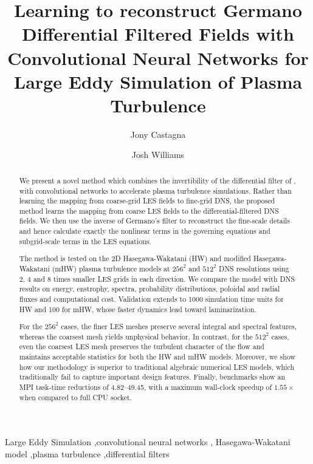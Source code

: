 \documentclass[authoryear,preprint,review,12pt]{elsarticle}
\begin{document}
\begin{frontmatter}

\title{Learning to reconstruct Germano Differential Filtered Fields with
Convolutional Neural Networks for Large Eddy Simulation of Plasma Turbulence
}

\author{Jony Castagna}
\author{Josh Williams}


\begin{abstract}
We present a novel method which combines the invertibility of the differential filter of \citet{germano_differential_1986}, with convolutional networks to accelerate plasma turbulence simulations.
Rather than learning the mapping from coarse-grid LES fields to fine-grid DNS, the proposed method learns the mapping from coarse LES fields to the differential-filtered DNS fields. 
We then use the inverse of Germano's filter to reconstruct the fine-scale details and hence calculate exactly the nonlinear terms in the governing equations and subgrid-scale terms in the LES equations.

The method is tested on the 2D Hasegawa-Wakatani (HW) and modified Hasegawa-Wakatani (mHW) plasma turbulence models at $256^2$ and $512^2$ DNS resolutions using 2, 4 and 8 times smaller LES grids in each direction. We compare the model with DNS results on energy, enstrophy, spectra, probability distributions, poloidal and radial fluxes and computational cost. Validation extends to 1000 simulation time units for HW and 100 for mHW, whose faster dynamics lead toward laminarization.

For the $256^2$ cases, the finer LES meshes preserve several integral and spectral features, whereas the coarsest mesh yields unphysical behavior. In contrast, for the $512^2$ cases, even the coarsest LES mesh preserves the turbulent character of the flow and maintains acceptable statistics for both the HW and mHW models. Moreover, we show how our methodology is superior to traditional algebraic numerical LES models, which traditionally fail to capture important design features.
Finally, benchmarks show an MPI task-time reductions of 4.82--49.45, with a maximum wall-clock speedup of $1.55\times$ when compared to full CPU socket.
\end{abstract}

\begin{keyword}
Large Eddy Simulation \sep convolutional neural networks \sep 
Hasegawa-Wakatani model \sep plasma turbulence \sep differential filters
\end{keyword}

\end{frontmatter}
%
%
%
%
%
%
%
\end{document}
